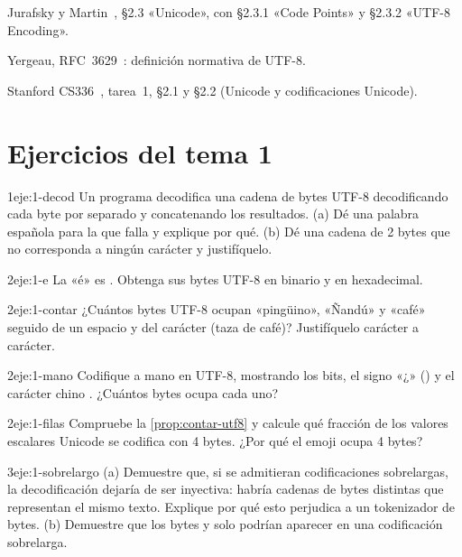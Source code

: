 \begin{lecturas}
\item Jurafsky y Martin~\cite{jm3}, §2.3 «Unicode», con §2.3.1 «Code Points» y §2.3.2 «UTF-8 Encoding».
\item Yergeau, RFC~3629~\cite{rfc3629}: definición normativa de UTF-8.
\item Stanford CS336~\cite{cs336}, tarea~1, §2.1 y §2.2 (Unicode y codificaciones Unicode).
\end{lecturas}

\section*{Ejercicios del tema 1}

\begin{ejercicio}{1}{eje:1-decod}
Un programa decodifica una cadena de bytes UTF-8 decodificando cada byte por separado y concatenando los resultados. (a) Dé una palabra española para la que falla y explique por qué. (b) Dé una cadena de 2 bytes que no corresponda a ningún carácter y justifíquelo.
\end{ejercicio}

\begin{ejercicio}{2}{eje:1-e}
La «é» es . Obtenga sus bytes UTF-8 en binario y en hexadecimal.
\end{ejercicio}

\begin{ejercicio}{2}{eje:1-contar}
¿Cuántos bytes UTF-8 ocupan «pingüino», «Ñandú» y «café» seguido de un espacio y del carácter  (taza de café)? Justifíquelo carácter a carácter.
\end{ejercicio}

\begin{ejercicio}{2}{eje:1-mano}
Codifique a mano en UTF-8, mostrando los bits, el signo «¿» () y el carácter chino . ¿Cuántos bytes ocupa cada uno?
\end{ejercicio}

\begin{ejercicio}{2}{eje:1-filas}
Compruebe la \cref{prop:contar-utf8} y calcule qué fracción de los valores escalares Unicode se codifica con 4 bytes. ¿Por qué el emoji  ocupa 4 bytes?
\end{ejercicio}

\begin{ejercicio}{3}{eje:1-sobrelargo}
(a) Demuestre que, si se admitieran codificaciones sobrelargas, la decodificación dejaría de ser inyectiva: habría cadenas de bytes distintas que representan el mismo texto. Explique por qué esto perjudica a un tokenizador de bytes. (b) Demuestre que los bytes  y  solo podrían aparecer en una codificación sobrelarga.
\end{ejercicio}
